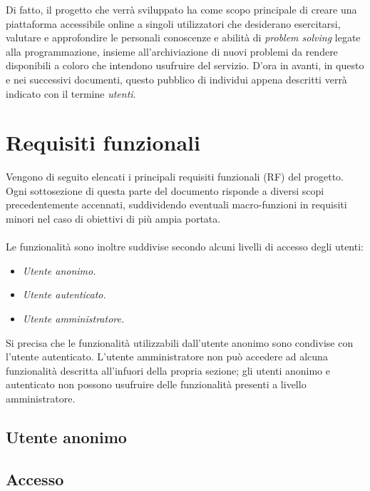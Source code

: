 \documentclass[11pt, a4paper]{article}
\theoremstyle{definition}
\begin{document}
Di fatto, il progetto che verrà sviluppato ha come scopo principale di
creare una piattaforma accessibile online a singoli utilizzatori che
desiderano esercitarsi, valutare e approfondire le personali
conoscenze e abilità di \textit{problem solving} legate alla programmazione,
insieme all'archiviazione di nuovi problemi da rendere disponibili a coloro
che intendono usufruire del servizio.
D'ora in avanti, in questo e nei successivi documenti, questo pubblico di
individui appena descritti verrà indicato con il termine \textit{utenti}.

\newpage
\section{Requisiti funzionali}
Vengono di seguito elencati i principali requisiti funzionali (RF)
del progetto. Ogni sottosezione di questa parte del documento
risponde a diversi scopi precedentemente accennati, suddividendo
eventuali macro-funzioni in requisiti minori nel caso di obiettivi
di più ampia portata.
\\\\
\noindent Le funzionalità sono inoltre suddivise secondo alcuni livelli di accesso
degli utenti:
\begin{itemize}
    \item \textit{Utente anonimo.}
    \item \textit{Utente autenticato.}
    \item \textit{Utente amministratore.}
\end{itemize}
Si precisa che le funzionalità utilizzabili dall'utente anonimo sono condivise
con l'utente autenticato. L'utente amministratore non può accedere ad alcuna
funzionalità descritta all'infuori della propria sezione; gli utenti anonimo e
autenticato non possono usufruire delle funzionalità presenti a livello amministratore.

\begin{center}
\section*{Utente anonimo}    
\end{center}


\subsection{Accesso}
\end{document}
